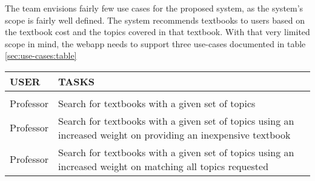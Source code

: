 The team envisions fairly few use cases for the proposed system, as
the system's scope is fairly well defined.
The system recommends textbooks to users based on the textbook cost
and the topics covered in that textbook.
With that very limited scope in mind, the webapp needs to support
three use-cases documented in table \ref{sec:use-cases:table}

\begin{table*}[h]
\begin{center}
  \caption{Use Cases}
  \begin{tabular}{l p{10cm}}
    \bf USER & \bf TASKS \\ \hline \\
    Professor & Search for textbooks with a given set of topics \\
    Professor & Search for textbooks with a given set of topics using
                an increased weight on providing an inexpensive
                textbook \\
    Professor & Search for textbooks with a given set of topics using
                an increased weight on matching all topics requested 
  \end{tabular} \label{sec:use-cases:table}
\end{center}
\end{table*}

